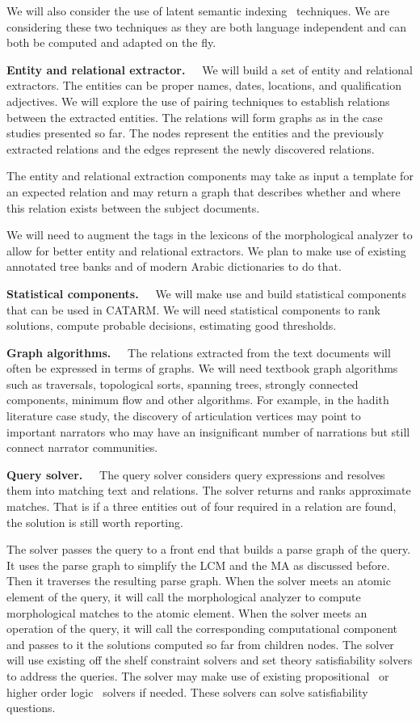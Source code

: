 \documentclass[12pt]{article}
\begin{document}
We will also consider the use of
latent semantic indexing~\cite{LSI89} techniques. 
We are considering these two techniques as they are 
both language independent and can both be computed and
adapted on the fly.

{\bf Entity and relational extractor.~~}
We will build a set of entity and relational extractors. 
The entities can be proper names, dates, locations,
and qualification adjectives. 
We will explore the use of pairing techniques to establish 
relations between the extracted entities.
The relations will form graphs as in the case studies presented
so far. The nodes represent the entities and the previously 
extracted relations and the edges represent the newly discovered 
relations.

The entity and relational extraction components 
may take as input a template for an expected relation and 
may return a graph that describes whether and where 
this relation exists between the subject documents.

We will need to augment the tags in the lexicons of the 
morphological analyzer to allow for better entity and relational
extractors. 
We plan to make use of existing annotated tree banks and of
modern Arabic dictionaries to do that. 

{\bf Statistical components.~~}
We will make use and build statistical components that can be used
in CATARM. 
We will need statistical components to rank solutions, compute 
probable decisions, estimating good thresholds. 

{\bf Graph algorithms.~~}
The relations extracted from the text documents will often 
be expressed in terms of graphs.
We will need textbook graph algorithms such as traversals, 
topological sorts, spanning trees, strongly connected 
components, minimum flow  and other algorithms.
For example, in the hadith literature case study, the discovery
of articulation vertices may point to important narrators 
who may have an insignificant number of narrations 
but still connect narrator communities.

{\bf Query solver.~~}
The query solver considers query expressions and resolves them 
into matching text and relations. 
The solver returns and ranks approximate matches.
That is if a three entities out of four required in a relation are
found, the solution is still worth reporting. 

The solver passes the query to a front end that builds
a parse graph of the query. 
It uses the parse graph to simplify the LCM and the MA
as discussed before. 
Then it traverses the resulting parse graph. 
When the solver meets an atomic element of the query, 
it will call the morphological analyzer to compute 
morphological matches to the atomic element.
When the solver meets an operation of the query, 
it will call the corresponding computational component 
and passes to it the solutions computed so far from children
nodes. 
The solver will use existing off the shelf constraint solvers 
and set theory satisfiability solvers to address the queries. 
The solver may make use of existing 
propositional~\cite{MiniSAT04} or
higher order logic~\cite{Z308} solvers if needed. 
These solvers can solve satisfiability questions.
\end{document}
